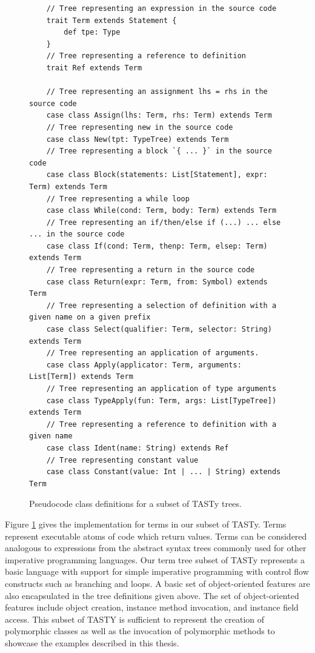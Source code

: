 \begin{figure}[!htb]
	\begin{verbatim}
	// Tree representing an expression in the source code
	trait Term extends Statement {
		def tpe: Type
	}
	// Tree representing a reference to definition      
	trait Ref extends Term             
	
	// Tree representing an assignment lhs = rhs in the source code
	case class Assign(lhs: Term, rhs: Term) extends Term
	// Tree representing new in the source code
	case class New(tpt: TypeTree) extends Term
	// Tree representing a block `{ ... }` in the source code
	case class Block(statements: List[Statement], expr: Term) extends Term
	// Tree representing a while loop
	case class While(cond: Term, body: Term) extends Term
	// Tree representing an if/then/else if (...) ... else ... in the source code
	case class If(cond: Term, thenp: Term, elsep: Term) extends Term
	// Tree representing a return in the source code
	case class Return(expr: Term, from: Symbol) extends Term
	// Tree representing a selection of definition with a given name on a given prefix
	case class Select(qualifier: Term, selector: String) extends Term 
	// Tree representing an application of arguments.
	case class Apply(applicator: Term, arguments: List[Term]) extends Term
	// Tree representing an application of type arguments
	case class TypeApply(fun: Term, args: List[TypeTree]) extends Term
	// Tree representing a reference to definition with a given name
	case class Ident(name: String) extends Ref 
	// Tree representing constant value
	case class Constant(value: Int | ... | String) extends Term 
	\end{verbatim} 
	\caption{Pseudocode class definitions for a subset of TASTy trees.}
	\label{tasty:terms}
\end{figure}

Figure \ref{tasty:terms} gives the implementation for terms in our subset of TASTy.
Terms represent executable atoms of code which return values.
Terms can be considered analogous to expressions from the abstract syntax trees commonly used for other imperative programming languages.
Our term tree subset of TASTy represents a basic language with support for simple imperative programming with control flow constructs such as branching and loops.
A basic set of object-oriented features are also encapsulated in the tree definitions given above.
The set of object-oriented features include object creation, instance method invocation, and instance field access.
This subset of TASTY is sufficient to represent the creation of polymorphic classes as well as the invocation of polymorphic methods to showcase the examples described in this thesis.

